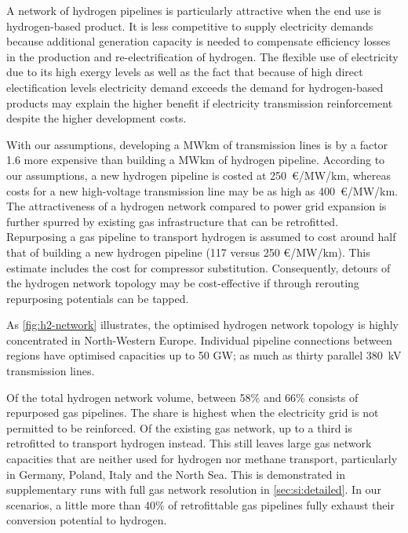 
A network of hydrogen pipelines is particularly attractive when the end use is
hydrogen-based product. It is less competitive to supply electricity demands
because additional generation capacity is needed to compensate efficiency losses
in the production and re-electrification of hydrogen. The flexible use of
electricity due to its high exergy levels as well as the fact that because of
high direct electification levels electricity demand exceeds the demand for
hydrogen-based products may explain the higher benefit if electricity
transmission reinforcement despite the higher development costs.

With our assumptions, developing a MWkm of transmission lines is by a factor 1.6
more expensive than building a MWkm of hydrogen pipeline. According to our
assumptions, a new hydrogen pipeline is costed at 250~\euro/MW/km, whereas costs
for a new high-voltage transmission line may be as high as 400~\euro/MW/km. The
attractiveness of a hydrogen network compared to power grid expansion is further
spurred by existing gas infrastructure that can be retrofitted. Repurposing a
gas pipeline to transport hydrogen is assumed to cost around half that of
building a new hydrogen pipeline (117 versus 250 \euro/MW/km). This estimate
includes the cost for compressor substitution. Consequently, detours of the
hydrogen network topology may be cost-effective if through rerouting repurposing
potentials can be tapped.


As \cref{fig:h2-network} illustrates, the optimised hydrogen network topology is
highly concentrated in North-Western Europe. Individual pipeline connections
between regions have optimised capacities up to 50 GW; as much as thirty
parallel 380~kV transmission lines.

Of the total hydrogen network volume, between 58\% and 66\% consists of
repurposed gas pipelines. The share is highest when the electricity grid is not
permitted to be reinforced. Of the existing gas network, up to a third is
retrofitted to %
transport hydrogen instead. This still leaves large gas network capacities that
are neither used for hydrogen nor methane transport, particularly in Germany,
Poland, Italy and the North Sea. This is demonstrated in supplementary runs with
full gas network resolution in \cref{sec:si:detailed}. In our scenarios, a
little more than 40\% of retrofittable gas pipelines fully exhaust their
conversion potential to hydrogen.

